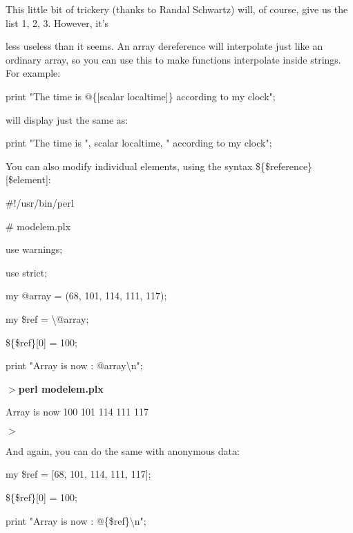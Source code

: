 \documentclass[a4paper,11pt]{book}
\begin{document}
\noindent 

\noindent This little bit of trickery (thanks to Randal Schwartz) will, of course, give us the list 1, 2, 3. However, it's

\noindent less useless than it seems. An array dereference will interpolate just like an ordinary array, so you can use this to make functions interpolate inside strings. For example:

\noindent 

\noindent print "The time is @\{[scalar localtime]\} according to my clock";

\noindent 

\noindent will display just the same as:

\noindent 

\noindent print "The time is ", scalar localtime, " according to my clock";

\noindent 

\noindent You can also modify individual elements, using the syntax \$\{\$reference\}[\$element]:

\noindent 

\noindent \#!/usr/bin/perl

\noindent \# modelem.plx

\noindent use warnings;

\noindent use strict;

\noindent 

\noindent my @array = (68, 101, 114, 111, 117);

\noindent my \$ref = \textbackslash @array;

\noindent \$\{\$ref\}[0] = 100;

\noindent print "Array is now : @array\textbackslash n";

\noindent 

\noindent $>$\textbf{perl modelem.plx}

\noindent Array is now 100 101 114 111 117

\noindent $>$

\noindent 

\noindent And again, you can do the same with anonymous data:

\noindent 

\noindent my \$ref = [68, 101, 114, 111, 117];

\noindent \$\{\$ref\}[0] = 100;

\noindent print "Array is now : @\{\$ref\}\textbackslash n";

\noindent 
\end{document}
